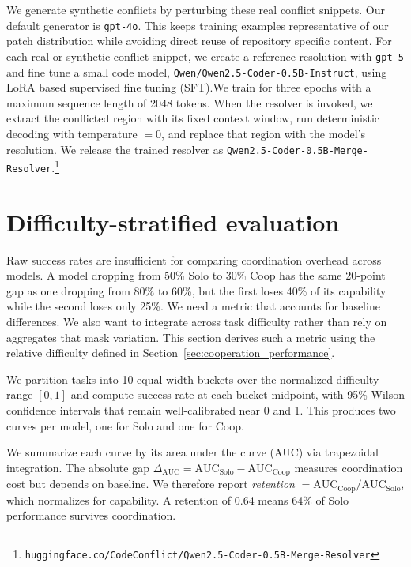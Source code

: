 We generate synthetic conflicts by perturbing these real conflict snippets. Our default generator is \texttt{gpt-4o}. This keeps training examples representative of our patch distribution while avoiding direct reuse of repository specific content. For each real or synthetic conflict snippet, we create a reference resolution with \texttt{gpt-5} and fine tune a small code model, \texttt{Qwen/Qwen2.5-Coder-0.5B-Instruct}, using LoRA based supervised fine tuning (SFT).\@ We train for three epochs with a maximum sequence length of 2048 tokens. When the resolver is invoked, we extract the conflicted region with its fixed context window, run deterministic decoding with temperature $=0$, and replace that region with the model's resolution. We release the trained resolver as \texttt{Qwen2.5-Coder-0.5B-Merge-Resolver}.\footnote{\texttt{huggingface.co/CodeConflict/Qwen2.5-Coder-0.5B-Merge-Resolver}}







\section{Difficulty-stratified evaluation}\label{app:ci}


Raw success rates are insufficient for comparing coordination overhead across models. A model dropping from 50\% Solo to 30\% Coop has the same 20-point gap as one dropping from 80\% to 60\%, but the first loses 40\% of its capability while the second loses only 25\%. We need a metric that accounts for baseline differences. We also want to integrate across task difficulty rather than rely on aggregates that mask variation. This section derives such a metric using the relative difficulty defined in Section~\ref{sec:cooperation_performance}.

We partition tasks into 10 equal-width buckets over the normalized difficulty range $[0,1]$ and compute success rate at each bucket midpoint, with 95\% Wilson confidence intervals that remain well-calibrated near 0 and 1. This produces two curves per model, one for Solo and one for Coop.

We summarize each curve by its area under the curve (AUC) via trapezoidal integration. The absolute gap $\Delta_{\mathrm{AUC}} = \mathrm{AUC}_{\mathrm{Solo}} - \mathrm{AUC}_{\mathrm{Coop}}$ measures coordination cost but depends on baseline. We therefore report \textit{retention} $= \mathrm{AUC}_{\mathrm{Coop}} / \mathrm{AUC}_{\mathrm{Solo}}$, which normalizes for capability. A retention of 0.64 means 64\% of Solo performance survives coordination.


